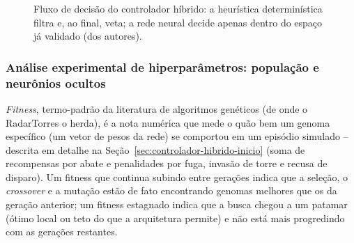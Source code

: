 \documentclass[12pt,a4paper]{article}
\begin{document}
\begin{figure}[htbp]
  \centering
  \caption{Fluxo de decisão do controlador híbrido: a heurística determinística filtra e, ao final,
  veta; a rede neural decide apenas dentro do espaço já validado (dos autores).}
\end{figure}

\subsubsection{Análise experimental de hiperparâmetros: população e neurônios ocultos}
\label{sec:experimento-hiperparametros}

\textit{Fitness}, termo-padrão da literatura de algoritmos genéticos (de onde o RadarTorres o
herda), é a nota numérica que mede o quão bem um genoma específico (um vetor de pesos da rede) se
comportou em um episódio simulado -- descrita em detalhe na Seção~\ref{sec:controlador-hibrido-inicio}
(soma de recompensas por abate e penalidades por fuga, invasão de torre e recusa de disparo). Um
fitness que continua subindo entre gerações indica que a seleção, o \textit{crossover} e a mutação
estão de fato encontrando genomas melhores que os da geração anterior; um fitness estagnado indica
que a busca chegou a um patamar (ótimo local ou teto do que a arquitetura permite) e não está mais
progredindo com as gerações restantes.
\end{document}
